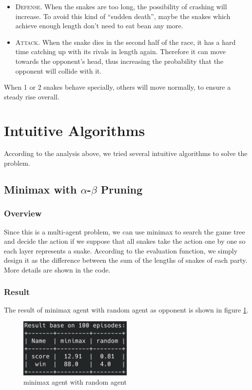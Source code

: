 \documentclass{article}
\begin{document}
\begin{itemize}
    \item \textsc{Defense}. When the snakes are too long, the possibility of crashing will increase. To avoid this kind of ``sudden death'', maybe the snakes which achieve enough length don't need to eat bean any more.
    \item \textsc{Attack}. When the snake dies in the second half of the race, it has a hard time catching up with its rivals in length again. Therefore it can move towards the opponent's head, thus increasing the probability that the opponent will collide with it.
\end{itemize}
    
When 1 or 2 snakes behave specially, others will move normally, to ensure a steady rise overall.

\section{Intuitive Algorithms}

According to the analysis above, we tried several intuitive algorithms to solve the problem.

\subsection{Minimax with $\alpha$-$\beta$ Pruning}

\subsubsection{Overview}
Since this is a multi-agent problem, we can use minimax to search the game tree and decide the action if we suppose that all snakes take the action one by one so each layer represents a snake. According to the evaluation function, we simply design it as the difference between the sum of the lengths of snakes of each party. More details are shown in the code.

\subsubsection{Result}

The result of minimax agent with random agent as opponent is shown in figure \ref{minimax-random}.

\begin{figure}[h]
  \centering
  \includegraphics[width=0.5\textwidth]{figs/minimax_vs_random.png}
  \caption{minimax agent with random agent}
  \label{minimax-random}
\end{figure}
\end{document}

